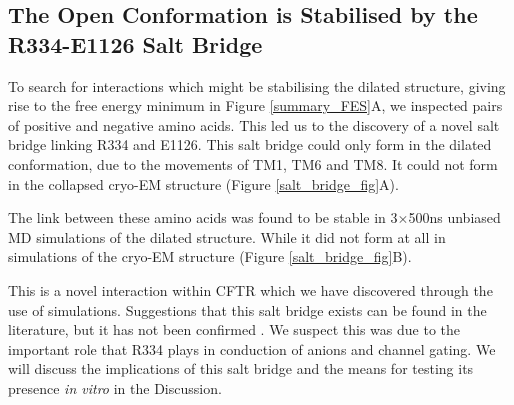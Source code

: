 \subsection{The Open Conformation is Stabilised by the R334-E1126 Salt Bridge}
\label{salt_bridge}

To search for interactions which might be stabilising the dilated structure, giving rise to the free energy minimum in Figure \ref{summary_FES}A, we inspected pairs of positive and negative amino acids. This led us to the discovery of a novel salt bridge linking R334 and E1126. This salt bridge could only form in the dilated conformation, due to the movements of TM1, TM6 and TM8. It could not form in the collapsed cryo-EM structure (Figure \ref{salt_bridge_fig}A). 


The link between these amino acids was found to be stable in 3$\times$500ns unbiased MD simulations of the dilated structure. While it did not form at all in simulations of the cryo-EM structure (Figure \ref{salt_bridge_fig}B).

This is a novel interaction within CFTR which we have discovered through the use of simulations. Suggestions that this salt bridge exists can be found in the literature, but it has not been confirmed \cite{cui2014, wang2016, gong2004, zhang2005}. We suspect this was due to the important role that R334 plays in conduction of anions and channel gating. We will discuss the implications of this salt bridge and the means for testing its presence \textit{in vitro} in the Discussion.

